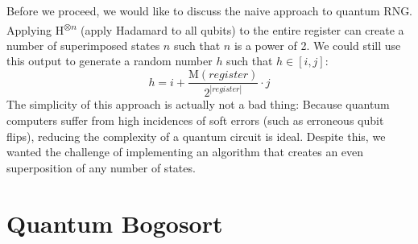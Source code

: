 \documentclass[12pt]{article}
\begin{document}
\begin{enumerate}
Before we proceed, we would like to discuss the naive approach to quantum RNG. Applying H\textsuperscript{$\otimes n$} (apply Hadamard to all qubits) to the entire register can create a number of superimposed states $ n $ such that $ n $ is a power of 2. We could still use this output to generate a random number $ h $ such that $ h \in [i, j] $:
$$ h = i + \frac{\text{M}(register)}{2^{|register|}} \cdot j $$
The simplicity of this approach is actually not a bad thing: Because quantum computers suffer from high incidences of soft errors (such as erroneous qubit flips), reducing the complexity of a quantum circuit is ideal. Despite this, we wanted the challenge of implementing an algorithm that creates an even superposition of any number of states.
\end{enumerate}
 
\section{Quantum Bogosort}
\end{document}
